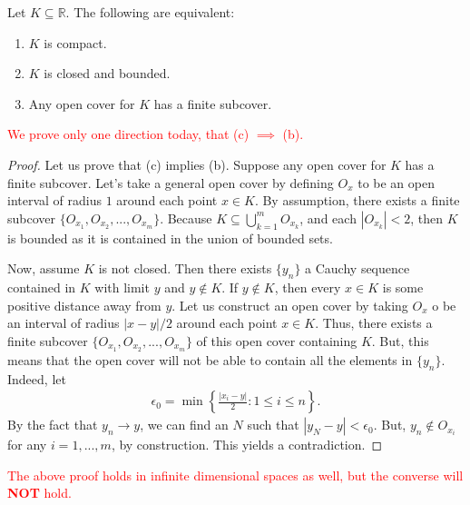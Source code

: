 \documentclass{ximera}
\begin{document}
\begin{theorem}
    Let $K \subseteq \mathbb{R}$.  The following are equivalent:
    \begin{enumerate}
        \item $K$ is compact.
        \item $K$ is closed and bounded.
        \item Any open cover for $K$ has a finite subcover.
    \end{enumerate}
\end{theorem}
\textcolor{red}{We prove only one direction today, that (c) $\implies$ (b).}
\begin{proof}
    Let us prove that (c) implies (b).  Suppose any open cover for $K$ has a finite subcover.  Let's take a general open cover by defining $O_x$ to be an open interval of radius $1$ around each point $x\in K$.  By assumption, there exists a finite subcover $\{O_{x_1}, O_{x_2}, ..., O_{x_m}\}$.  Because $K \subseteq \bigcup\limits_{k=1}^m O_{x_k}$, and each $|O_{x_k}| < 2$, then $K$ is bounded as it is contained in the union of bounded sets.

    Now, assume $K$ is not closed.  Then there exists $\{y_n\}$ a Cauchy sequence contained in $K$ with limit $y$ and $y \notin K$.  If $y \notin K$, then every $x \in K$ is some positive distance away from $y$.  Let us construct an open cover by taking $O_x$ o be an interval of radius $|x-y|/2$ around each point $x \in K$.  Thus, there exists a finite subcover $\{O_{x_1}, O_{x_2}, ..., O_{x_m}\}$ of this open cover containing $K$.  But, this means that the open cover will not be able to contain all the elements in $\{y_n\}$.  Indeed, let 
    \begin{align}
        \epsilon_0 = \min \left\{ \frac{|x_i-y|}2: 1 \leq i \leq n \right\}.
    \end{align}
    By the fact that $y_n \to y$, we can find an $N$ such that $|y_N-y| < \epsilon_0$.  But, $y_n \notin O_{x_i}$ for any $i = 1, ..., m$, by construction.  This yields a contradiction.
\end{proof}

\textcolor{red}{The above proof holds in infinite dimensional spaces as well, but the converse will \textbf{NOT} hold.}

    
\end{document}
